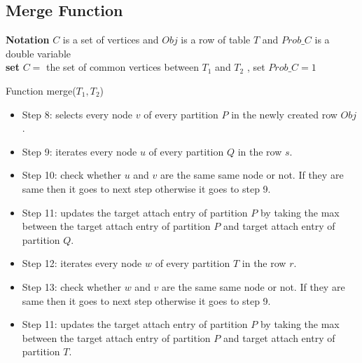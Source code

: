\documentclass[12pt]{article}
\begin{document}
\subsection{Merge Function }
\begin{algorithm}[H]
\Indm  
{}

\textbf{Notation} $C$ is a set of vertices and $Obj$ is a row of table $T$ and $Prob\_C$ is a double variable\\
\Indp
\nl \textbf{set} $C=$ the set of common vertices between $T_1$ and $T_2$ , set $Prob\_C=1$\\
 \nl {}
\nl {}

 \caption{Function merge($T_1,T_2$)}
\end{algorithm}

\begin{itemize}
\item Step 8: selects every node $v$ of every partition $P$ in the newly created row $Obj$.
\item Step 9: iterates every node $u$ of every partition $Q$ in the row $s$.
\item Step 10: check whether $u$ and $v$ are the same same node or not. If they are same then it goes to next step otherwise it goes to step 9.
\item Step 11: updates the target attach entry of partition $P$ by taking the max between the target attach entry of partition $P$ and target attach entry of partition $Q$.
\item Step 12: iterates every node $w$ of every partition $T$ in the row $r$.
\item Step 13: check whether $w$ and $v$ are the same same node or not. If they are same then it goes to next step otherwise it goes to step 9.
\item Step 11: updates the target attach entry of partition $P$ by taking the max between the target attach entry of partition $P$ and target attach entry of partition $T$.
\end{itemize}
\end{document}
